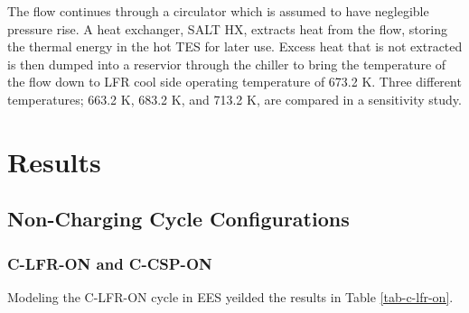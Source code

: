 \begin{paracol}{2}
\linenumbers
\switchcolumn

The flow continues through a circulator which is assumed to have neglegible pressure rise. A heat exchanger, SALT HX, extracts heat from the flow, storing the thermal energy in the hot TES for later use. Excess heat that is not extracted is then dumped into a reservior through the chiller to bring the temperature of the flow down to LFR cool side operating temperature of 673.2 K. Three different temperatures; 663.2 K, 683.2 K, and 713.2 K, are compared in a sensitivity study. 



\section{Results}

\subsection{Non-Charging Cycle Configurations}

\subsubsection{C-LFR-ON and C-CSP-ON}

Modeling the C-LFR-ON cycle in EES yeilded the results in Table \ref{tab-c-lfr-on}. 


\end{paracol}
